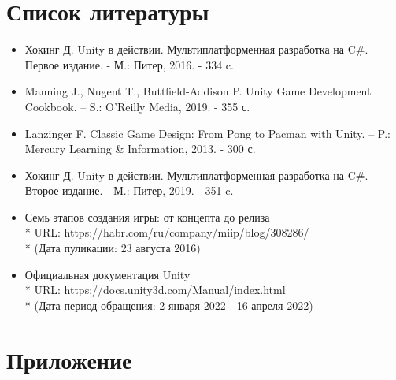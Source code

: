 \documentclass[14pt, titlepage,fleqn,a4paper]{extarticle}
\begin{document}
	\section*{Список литературы}
	
	\begin{itemize}
	
	\item Хокинг Д. Unity в действии. Мультиплатформенная разработка на C\#. Первое издание. - М.: Питер, 2016. - 334 c.
    \item Manning J., Nugent T., Buttfield-Addison P. Unity Game Development Cookbook. – S.: O’Reilly Media, 2019. - 355 с.
    \item Lanzinger F. Classic Game Design: From Pong to Pacman with Unity. – P.: Mercury Learning \& Information, 2013. - 300 с.
    \item Хокинг Д. Unity в действии. Мультиплатформенная разработка на C\#. Второе издание. - М.: Питер, 2019. - 351 c.
	
	\item Семь этапов создания игры: от концепта до релиза\\* URL: https://habr.com/ru/company/miip/blog/308286/ \\* (Дата пуликации: 23 августа 2016)
	\item Официальная документация Unity\\*  URL: https://docs.unity3d.com/Manual/index.html
	\\* (Дата период обращения:  2 января 2022 - 16 апреля 2022)
	
	\end{itemize}
	\newpage
	\section*{Приложение}
	
\end{document}
